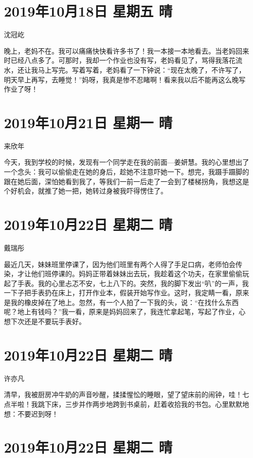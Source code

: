 \section{2019年10月18日 星期五 晴}

沈冠屹

晚上，老妈不在。我可以痛痛快快看许多书了！我一本接一本地看去。当老妈回来时已经八点多了。可那时，我却一个作业也没有写，老妈看见了，骂得我落花流水，还让我马上写完。写着写着，老妈看了一下钟说：``现在太晚了，不许写了，明天早上再写，去睡觉！''妈呀，我真是惨不忍睹啊！看来我以后不能再这么晚写作业了呀！

\section{2019年10月21日 星期一 晴}

来欣年

今天，我到学校的时候，发现有一个同学走在我的前面---姜妍慧。我的心里想出了一个念头：我可以偷偷走在她的身后，趁她不注意吓她一下。想完，我蹑手蹑脚的跟在她后面，深怕她看到我了，等我们一前一后走了一会到了楼梯拐角，我想这是个好机会，就推了她一把，她转过身被我吓得愣住了。

\section{2019年10月22日 星期二 晴}

戴瑞彤

最近几天，妹妹班里停课了，因为他们班里有两个人得了手足口病，老师怕会传染，才让他们班停课的。妈妈正带着妹妹出去玩，我趁着这个功夫，在家里偷偷玩起了手表。我的心里忐忑不安，七上八下的。突然，我的脚下发出``叭''的一声，我一下子把手表扔在床上，打开作业本，假装开始写作业。这时，我定睛一看，原来是我的橡皮掉在了地上。忽然，有一个人拍了一下我的头，说：``在找什么东西呢？地上有钱吗？''我一看，原来是妈妈回来了，我连忙拿起笔，写起了作业，心想下次还是不要玩手表好。

\section{2019年10月22日 星期二 晴}

许亦凡

清早，我被厨房冲牛奶的声音吵醒，揉揉惺忪的睡眼，望了望床前的闹钟，哇！七点半啦！我跳下床，三步并作两步地跨到书桌前，赶着收拾我的书包。心里默默地想：不要迟到呀！

\section{2019年10月22日 星期二 晴}

